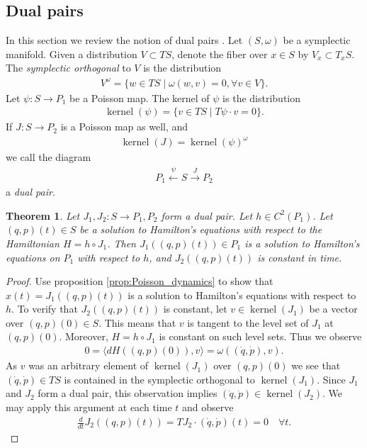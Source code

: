 \documentclass[12pt]{amsart}
\newtheorem{thm}{Theorem}[section]
\DeclareMathOperator{\kernel}{kernel}
\begin{document}
  \subsection{Dual pairs}
  In this section we review the notion of dual pairs
  \cite{MarsdenWeinstein1983,Weinstein1983,GayBalmazVizman2012}.
  Let $(S,\omega)$ be a symplectic manifold.
  Given a distribution $V \subset TS$, denote the fiber over 
  $x \in S$ by $V_x \subset T_x S$.
  The \emph{symplectic orthogonal} to $V$ is the distribution
  \begin{align*}
    V^\omega = \{ w \in TS \mid \omega( w , v ) = 0, \forall v \in V \}.
  \end{align*}
  Let $\psi:S \to P_1$ be a Poisson map.
  The kernel of $\psi$ is the distribution
  \begin{align*}
    \kernel(\psi) = \{ v \in TS \mid T\psi \cdot v  = 0 \}.
  \end{align*}
  If $J:S \to P_2$ is a Poisson map as well, and
  \begin{align*}
    \kernel(J) = \kernel(\psi)^\omega
  \end{align*}
  we call the diagram
  \begin{align*}
    P_1 \stackrel{\psi}{\leftarrow} S \stackrel{J}{\to} P_2
  \end{align*}
  a \emph{dual pair}.

  \begin{thm} \label{thm:dual_pairs}
    Let $J_1,J_2:S \to P_1,P_2$ form a dual pair.
    Let $h \in C^2(P_1)$.
    Let $(q,p)(t) \in S$ be a solution to Hamilton's equations
    with respect to the Hamiltonian $H = h \circ J_1$.
    Then $J_1\left( (q,p)(t) \right) \in P_1$ is a solution
    to Hamilton's equations on $P_1$ with respect to $h$,
    and $J_2( (q,p)(t))$ is constant in time.
  \end{thm}
  \begin{proof}
    Use proposition \ref{prop:Poisson_dynamics} to show that
    $x(t) = J_1 ((q,p)(t))$ is a solution to Hamilton's equations
    with respect to $h$.
    To verify that $J_2( (q,p)(t) )$ is constant,
    let $v \in \kernel(J_1)$ be a vector over $(q,p)(0) \in S$.
    This means that $v$ is tangent to the level set of $J_1$ at $(q,p)(0)$.
    Moreover, $H = h \circ J_1$ is constant on such level sets.
    Thus we observe
    \begin{align*}
      0 = \langle dH((q,p)(0)) , v \rangle =
      \omega \left( (\dot{q},\dot{p}) , v \right).
    \end{align*}
    As $v$ was an arbitrary element of $\kernel(J_1)$ over $(q,p)(0)$
    we see that $(\dot{q},\dot{p}) \in TS$ is contained
    in the symplectic orthogonal to $\kernel(J_1)$.
    Since $J_1$ and $J_2$ form a dual pair,
    this observation implies $(\dot{q},\dot{p}) \in \kernel(J_2)$.
    We may apply this argument at each time $t$ and observe
    \begin{align*}
      \frac{d}{dt} J_2( (q,p)(t)) = TJ_2 \cdot (\dot{q},\dot{p})(t)  
      = 0 \quad \forall t.
    \end{align*}
  \end{proof}
  
\end{document}
